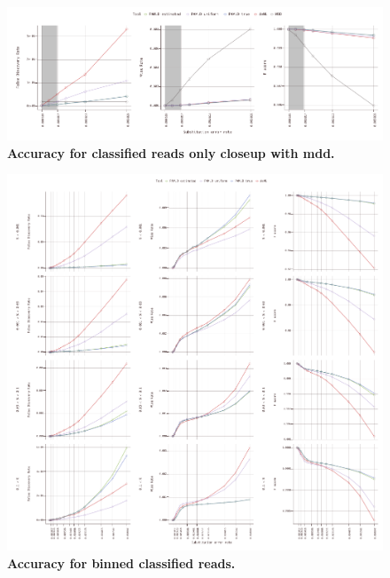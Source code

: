 \documentclass[10pt,twocolumn]{article}
\begin{document}
\begin{figure}[htbp]
\centering
\includegraphics[keepaspectratio,scale=1]{../plot/6_classified_accuracy_0060_mdd}
\caption{\footnotesize{\textbf{Accuracy for classified reads only closeup with mdd.} } }
\label{fig:06}
\end{figure}

\begin{figure}[htbp]
\centering
\includegraphics[keepaspectratio,scale=1]{../plot/7_classified_accuracy_0550_binned}
\caption{\footnotesize{\textbf{Accuracy for binned classified reads.} } }
\label{fig:07}
\end{figure}
\end{document}
